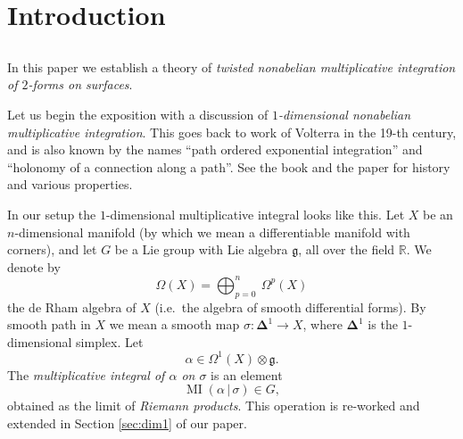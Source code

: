 \documentclass[10pt, a4paper]{amsart}
\theoremstyle{definition}
\numberwithin{equation}{section}
\newcommand{\opn}{\operatorname}
\newcommand{\mfrak}[1]{\mathfrak{#1}}
\newcommand{\mbb}[1]{\mathbb{#1}}
\newcommand{\bsym}[1]{\boldsymbol{#1}}
\newcommand{\boplus}{\bigoplus\nolimits}
\renewcommand{\vert}{\, | \,}
\newcommand{\R}{\mbb{R}}
\newcommand{\g}{\mfrak{g}}
\begin{document}
\maketitle



\tableofcontents

\cleardoublepage



\setcounter{page}{1}
\renewcommand\thepage{\arabic{page}} %
\cleardoublepage
\setcounter{section}{-1}
\section{Introduction}


\subsection{}
In this paper we establish a theory of {\em twisted nonabelian multiplicative
integration of $2$-forms on surfaces}. 

Let us begin the exposition with a discussion of 
{\em $1$-dimensional nonabelian multiplicative integration}. 
This goes back to work of Volterra in the 19-th
century, and is also known by the names ``path ordered exponential integration''
and ``holonomy of a connection along a path''. See the book \cite{DF} and
the paper \cite{KMR} for history and various properties. 

In our setup the $1$-dimensional multiplicative integral looks like this. 
Let $X$ be an $n$-dimensional manifold (by which we mean a differentiable
manifold with corners), and let $G$ be a Lie group with Lie algebra $\g$, 
all over the field  $\R$. We denote by
\[ \Omega(X) = \boplus_{p = 0}^n \ \Omega^p(X) \]
the de Rham algebra of $X$ (i.e.\ the algebra of smooth differential forms).
By smooth path in $X$ we mean a smooth map 
$\sigma: \bsym{\Delta}^1 \to X$, where $\bsym{\Delta}^1$ is the $1$-dimensional
simplex. Let
\[ \alpha \in  \Omega^1(X) \otimes \g . \]
The {\em multiplicative integral of $\alpha$ on $\sigma$} is an element
\begin{equation} \label{eqn:163}
\opn{MI}(\alpha \vert \sigma) \in G , 
\end{equation}
obtained as the limit of {\em Riemann products}.
This operation is re-worked and extended in Section \ref{sec:dim1} of our
paper.
\end{document}
